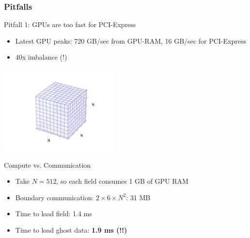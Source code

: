 \begin{frame}[fragile]
\frametitle{Pitfalls}
  \begin{block}{Pitfall 1: GPUs are too fast for PCI-Express}
  \begin{itemize}
   \item Latest GPU peaks: 720 GB/sec from GPU-RAM, 16 GB/sec for PCI-Express
   \item 40x imbalance (!)
  \end{itemize}
  \end{block}

  \begin{center} \vspace*{-0.5cm}
    \includegraphics[width=0.45\textwidth]{figures/cube-discretization}
  \end{center}

   \begin{block}{Compute vs. Communication}
  \begin{itemize}
   \item Take $N=512$, so each field consumes 1 GB of GPU RAM
   \item Boundary communication: $2 \times 6 \times N^2$: 31 MB
   \item Time to load field: 1.4 ms
   \item Time to load ghost data: \textbf{1.9 ms (!!)}
  \end{itemize}
  \end{block}

\end{frame}


